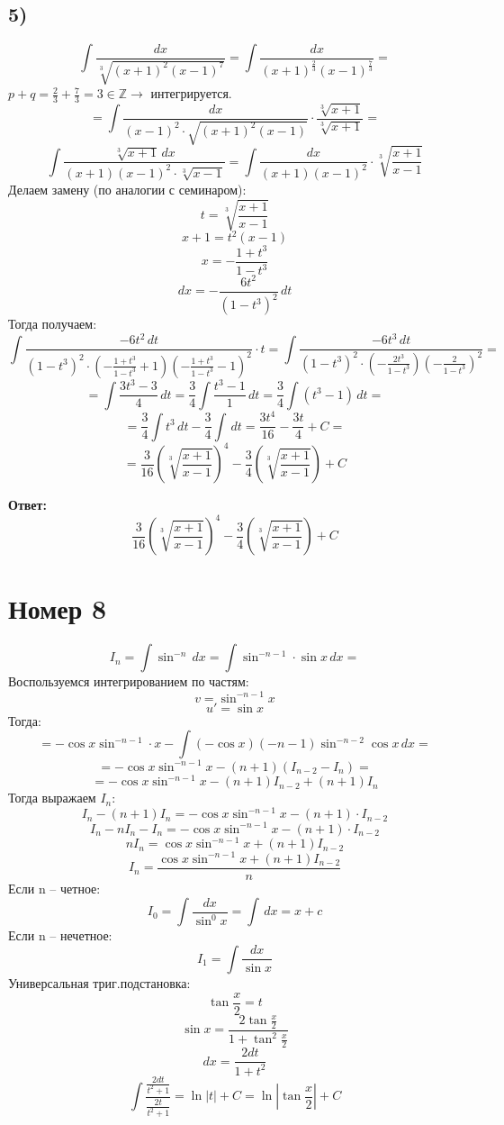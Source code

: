 \documentclass[a4paper,12pt]{article}
\begin{document}
\subsection*{5)}
\[
\int \frac{dx}{\sqrt[3]{(x+1)^2(x-1)^7}} = \int \frac{dx}{(x+1)^{\frac{2}{3}} (x-1)^{\frac{7}{3}}} = 
\]
$p + q = \frac{2}{3}  + \frac{7}{3} = 3 \in \mathbb{Z} \rightarrow $ интегрируется.
\[
=
\int \frac{dx}{(x-1)^2 \cdot \sqrt{(x+1)^2(x-1)}} \cdot \frac{\sqrt[3]{x+1}}{\sqrt[3]{x+1}} = 
\]
\[
\int \frac{\sqrt[3]{x+1} \, dx}{(x+1)(x-1)^2 \cdot \sqrt[3]{x-1}} = \int \frac{dx}{(x+1)(x-1)^2} \cdot \sqrt[3]{\frac{x+1}{x-1}}
\]
 Делаем замену (по аналогии с семинаром):
\[
t = \sqrt[3]{\frac{x+1}{x-1}}
\]
\[
x + 1 = t^2(x-1)
\]
\[
x = - \frac{1+t^3}{1-t^3}
\]
\[
dx  = - \frac{6t^2}{(1-t^3)^2} \, dt
\]
Тогда получаем:
\[
\int \frac{-6t^2 \, dt}{(1-t^3)^2 \cdot \left(-\frac{1+t^3}{1-t^3} + 1\right) \left( - \frac{1+t^3}{1-t^3} - 1\right)^2} \cdot t= \int \frac{-6t^3 \, dt}{(1-t^3)^2 \cdot \left(-\frac{2t^3}{1 - t^3}\right) \left( -\frac{2}{1-t^3} \right)^2}  = 
\]
\[
= \int \frac{3t^3 - 3}{4} \, dt = \frac{3}{4} \int \frac{t^3 - 1}{1} \, dt = \frac{3}{4} \int (t^3 -1) \, dt = 
\]
\[
= \frac{3}{4} \int t^3 \, dt - \frac{3}{4} \int \, dt = \frac{3t^4}{16}  - \frac{3t}{4} + C = 
\]
\[
= \frac{3}{16} \left( \sqrt[3]{ \frac{x+1}{x-1} } \right)^4 - \frac{3}{4} \left( \sqrt[3]{ \frac{x+1}{x-1} } \right) + C
\]
\begin{center}
\textbf{Ответ: } 
\[
\frac{3}{16} \left( \sqrt[3]{ \frac{x+1}{x-1} } \right)^4 - \frac{3}{4} \left( \sqrt[3]{ \frac{x+1}{x-1} } \right) + C
\]
\end{center}

\section*{Номер 8}
\[
I_n = \int \sin^{-n} \, dx = \int \sin^{-n-1} \cdot \sin x \, dx = 
\]
Воспользуемся интегрированием по частям:
\[
v = \sin^{-n-1} x
\]
\[
u' = \sin x
\]
Тогда:
\[
= 
-\cos x \sin^{-n-1} \cdot x - \int (-\cos x)(-n-1) \sin ^{-n - 2} \cos x \, dx =
\]
\[
=
- \cos x \sin^{-n-1} x - (n+1)(I_{n-2} - I_n) = 
\]
\[
=
-\cos x \sin^{-n-1} x - (n+1)I_{n-2} +(n+1)I_n
\]
Тогда выражаем $I_n$:
\[
I_n - (n+1)I_n = -\cos x \sin^{-n-1} x - (n+1) \cdot I_{n-2}
\]
\[
I_n -nI_n -I_n = -\cos x \sin^{-n-1} x - (n+1) \cdot I_{n-2}
\]
\[
nI_n = \cos x \sin^{-n-1} x + (n+1)I_{n-2}
\]
\[
I_n = \frac{\cos x \sin^{-n-1} x + (n+1)I_{n-2}}{n}
\]
Если n -- четное:
\[
I_0 = \int \frac{dx}{\sin^0 x} = \int \, dx = x + c
\]
Если n -- нечетное:
\[
I_1 = \int \frac{dx}{\sin x} 
\]
Универсальная триг.подстановка:
\[
\tan \frac{x}{2} = t
\]
\[
\sin x = \frac{2 \tan \frac{x}{2}}{1 + \tan^2 \frac{x}{2}}
\]
\[
dx = \frac{2dt}{1 + t^2}
\]
\[
\int \frac{\frac{2dt}{t^2 + 1}}{\frac{2t}{t^2+1}} = \ln |t| + C = \ln |\tan \frac{x}{2}| + C
\]
\end{document}
